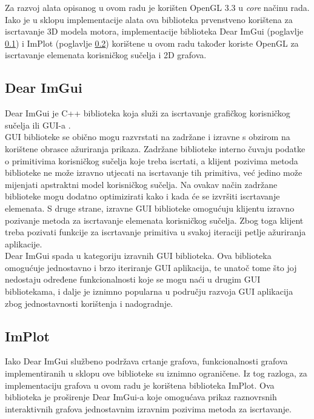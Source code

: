 \documentclass[times, utf8, diplomski]{fer}
\begin{document}
Za razvoj alata opisanog u ovom radu je korišten OpenGL 3.3 u \textit{core} načinu rada. Iako je u sklopu implementacije alata ova biblioteka prvenstveno korištena za iscrtavanje 3D modela motora, implementacije biblioteka Dear ImGui (poglavlje \ref{imgui-section}) i ImPlot (poglavlje \ref{implot-section}) korištene u ovom radu također koriste OpenGL za iscrtavanje elemenata korisničkog sučelja i 2D grafova.

\subsection{Dear ImGui} \label{imgui-section}
Dear ImGui\citep{imgui} je C++ biblioteka koja služi za iscrtavanje grafičkog korisničkog sučelja ili GUI-a .\\

GUI biblioteke se obično mogu razvrstati na zadržane  i izravne  s obzirom na korištene obrasce ažuriranja prikaza. Zadržane biblioteke interno čuvaju podatke o primitivima korisničkog sučelja koje treba iscrtati, a klijent pozivima metoda biblioteke ne može izravno utjecati na iscrtavanje tih primitiva, već jedino može mijenjati apstraktni model korisničkog sučelja. Na ovakav način zadržane biblioteke mogu dodatno optimizirati kako i kada će se izvršiti iscrtavanje elemenata. S druge strane, izravne GUI biblioteke omogućuju klijentu izravno pozivanje metoda za iscrtavanje elemenata korisničkog sučelja. Zbog toga klijent treba pozivati funkcije za iscrtavanje primitiva u svakoj iteraciji petlje ažuriranja aplikacije.\\

Dear ImGui spada u kategoriju izravnih GUI biblioteka. Ova biblioteka omogućuje jednostavno i brzo iteriranje GUI aplikacija, te unatoč tome što joj nedostaju određene funkcionalnosti koje se mogu naći u drugim GUI bibliotekama, i dalje je iznimno popularna u području razvoja GUI aplikacija zbog jednostavnosti korištenja i nadogradnje.

\subsection{ImPlot} \label{implot-section}

Iako Dear ImGui službeno podržava crtanje grafova, funkcionalnosti grafova implementiranih u sklopu ove biblioteke su iznimno ograničene. Iz tog razloga, za implementaciju grafova u ovom radu je korištena biblioteka ImPlot\citep{implot}. Ova biblioteka je proširenje Dear ImGui-a koje omogućava prikaz raznovrsnih interaktivnih grafova jednostavnim izravnim pozivima metoda za iscrtavanje. 
\end{document}
